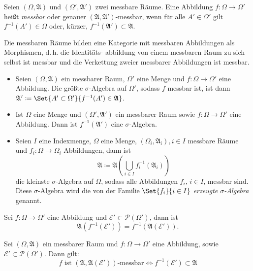 \documentclass{cheat-sheet}
\newcommand{\Alg}{\mathfrak{A}} %
\theoremstyle{definition}
\begin{document}
\begin{defn}
  Seien $(\Omega, \Alg)$ und $(\Omega', \Alg')$ zwei messbare Räume. Eine Abbildung $f : \Omega \to \Omega'$ heißt \emph{messbar} oder genauer $(\Alg, \Alg')$-messbar, wenn für alle $A' \in \Omega'$ gilt $f^{-1}(A') \in \Omega$ oder, kürzer, $f^{-1}(\Alg') \subset \Alg$.
\end{defn}

\begin{bem}
  Die messbaren Räume bilden eine Kategorie mit messbaren Abbildungen als Morphismen, d.\,h. die Identitäts- abbildung von einem messbaren Raum zu sich selbst ist messbar und die Verkettung zweier messbarer Abbildungen ist messbar.
\end{bem}

\begin{satz}
  \begin{itemize}
    \item Seien $(\Omega, \Alg)$ ein messbarer Raum, $\Omega'$ eine Menge und $f : \Omega \to \Omega'$ eine Abbildung. Die größte $\sigma$-Algebra auf $\Omega'$, sodass $f$ messbar ist, ist dann $\Alg' \coloneqq \Set{ A' \subset \Omega' }{ f^{-1}(A') \in \Alg }$.
    \item Ist $\Omega$ eine Menge und $(\Omega', \Alg')$ ein messbarer Raum sowie $f : \Omega \to \Omega'$ eine Abbildung. Dann ist $f^{-1}(\Alg')$ eine $\sigma$-Algebra.
    \item Seien $I$ eine Indexmenge, $\Omega$ eine Menge, $(\Omega_i, \Alg_i), i \in I$ messbare Räume und $f_i : \Omega \to \Omega_i$ Abbildungen, dann ist
    \[ \Alg \coloneqq \Alg\left( \bigcup_{i \in I} f_i^{-1}(\Alg_i) \right) \]
    die kleinste $\sigma$-Algebra auf $\Omega$, sodass alle Abbildungen $f_i$, $i \in I$, messbar sind. Diese $\sigma$-Algebra wird die von der Familie $\Set{ f_i }{i \in I}$ \emph{erzeugte $\sigma$-Algebra} genannt.
  \end{itemize}
\end{satz}

\begin{satz}
  Sei $f : \Omega \to \Omega'$ eine Abbildung und $\mathcal{E}' \subset \mathcal{P}(\Omega')$, dann ist
  \[ \Alg(f^{-1}(\mathcal{E}')) = f^{-1}(\Alg(\mathcal{E}')). \]
\end{satz}

\begin{satz}
  Sei $(\Omega, \Alg)$ ein messbarer Raum und $f : \Omega \to \Omega'$ eine Abbildung, sowie $\mathcal{E'} \subset \mathcal{P}(\Omega')$. Dann gilt:
  \[ f \text{ ist } (\Alg, \Alg(\mathcal{E}')) \text{-messbar} \iff f^{-1}(\mathcal{E}') \subset \Alg \]
\end{satz}
\end{document}
